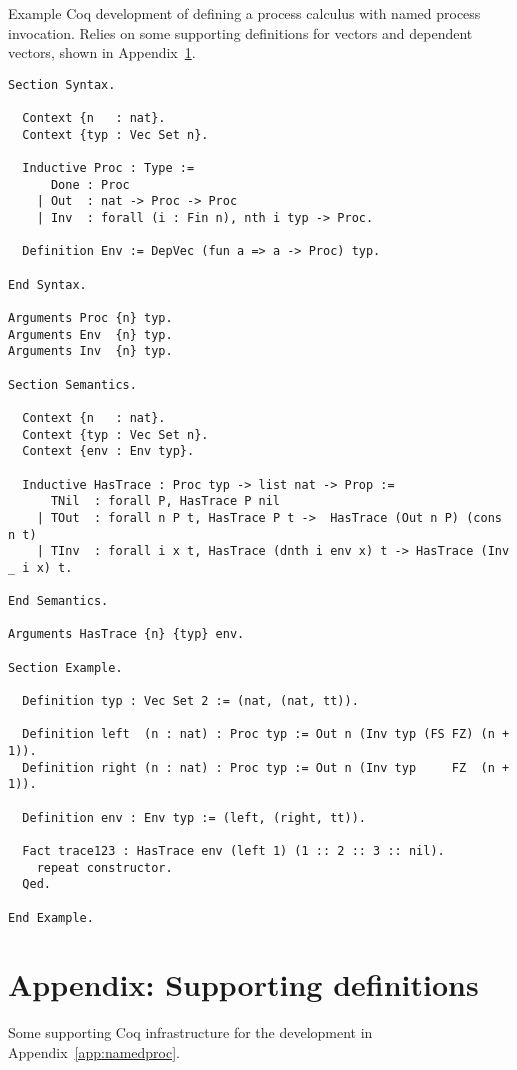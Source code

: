 \documentclass{article}
\begin{document}
Example Coq development of defining a process calculus with named
process invocation. Relies on some supporting definitions for vectors and
dependent vectors, shown in Appendix~\ref{app:coqaux}.

\begin{lstlisting}[language=Coq]
Section Syntax.

  Context {n   : nat}.
  Context {typ : Vec Set n}.

  Inductive Proc : Type :=
      Done : Proc
    | Out  : nat -> Proc -> Proc
    | Inv  : forall (i : Fin n), nth i typ -> Proc.

  Definition Env := DepVec (fun a => a -> Proc) typ.

End Syntax.

Arguments Proc {n} typ.
Arguments Env  {n} typ.
Arguments Inv  {n} typ.

Section Semantics.

  Context {n   : nat}.
  Context {typ : Vec Set n}.
  Context {env : Env typ}.

  Inductive HasTrace : Proc typ -> list nat -> Prop :=
      TNil  : forall P, HasTrace P nil
    | TOut  : forall n P t, HasTrace P t ->  HasTrace (Out n P) (cons n t)
    | TInv  : forall i x t, HasTrace (dnth i env x) t -> HasTrace (Inv _ i x) t.

End Semantics.

Arguments HasTrace {n} {typ} env.

Section Example.

  Definition typ : Vec Set 2 := (nat, (nat, tt)).

  Definition left  (n : nat) : Proc typ := Out n (Inv typ (FS FZ) (n + 1)).
  Definition right (n : nat) : Proc typ := Out n (Inv typ     FZ  (n + 1)).

  Definition env : Env typ := (left, (right, tt)).

  Fact trace123 : HasTrace env (left 1) (1 :: 2 :: 3 :: nil).
    repeat constructor.
  Qed.

End Example.
\end{lstlisting}

\section{Appendix: Supporting definitions}
\label{app:coqaux}

Some supporting Coq infrastructure for the development in Appendix~\ref{app:namedproc}.
\end{document}
